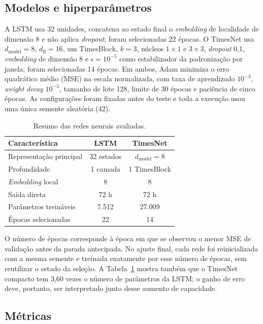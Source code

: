\documentclass[10pt,conference,a4paper]{IEEEtran}
\begin{document}
\subsection{Modelos e hiperparâmetros}

A LSTM usa 32 unidades, concatena ao estado final o \textit{embedding} de
localidade de dimensão 8 e não aplica \textit{dropout}; foram selecionadas 22
épocas. O TimesNet usa $d_{\mathrm{model}}=8$, $d_{\mathrm{ff}}=16$, um
TimesBlock, $k=3$, núcleos $1\times1$ e $3\times3$, \textit{dropout} 0,1,
\textit{embedding} de dimensão 8 e $\epsilon=10^{-5}$ como estabilizador da
padronização por janela; foram selecionadas 14 épocas. Em ambos, Adam minimiza
o erro quadrático médio (MSE) na escala normalizada, com taxa de aprendizado
$10^{-3}$, \textit{weight decay} $10^{-5}$, tamanho de lote 128, limite de 30 épocas e
paciência de cinco épocas.
As configurações foram fixadas antes do teste e toda a execução usou uma única
semente aleatória (42).

\begin{table}[!t]
\centering
\caption{Resumo das redes neurais avaliadas.}
\label{tab:configuracao_redes}
\scriptsize
\setlength{\tabcolsep}{3.2pt}
\renewcommand{\arraystretch}{0.96}
\begin{tabular}{lcc}
\toprule
\textbf{Característica} & \textbf{LSTM} & \textbf{TimesNet} \\
\midrule
Representação principal & 32 estados & $d_{\mathrm{model}}=8$ \\
Profundidade & 1 camada & 1 TimesBlock \\
\textit{Embedding} local & 8 & 8 \\
Saída direta & 72 h & 72 h \\
Parâmetros treináveis & 7.512 & 27.009 \\
Épocas selecionadas & 22 & 14 \\
\bottomrule
\end{tabular}
\end{table}

O número de épocas corresponde à época em que se observou o menor MSE de
validação antes da parada antecipada. No ajuste final, cada rede foi
reinicializada com a mesma semente e treinada exatamente por esse número de
épocas, sem reutilizar o estado da seleção. A
Tabela~\ref{tab:configuracao_redes} mostra também que o TimesNet compacto tem
3,60 vezes o número de parâmetros da LSTM; o ganho de erro deve, portanto, ser
interpretado junto desse aumento de capacidade.

\subsection{Métricas}
\end{document}
